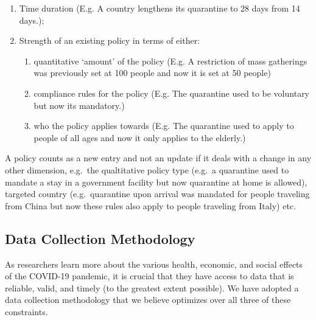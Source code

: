 \documentclass[]{article}
\providecommand{\tightlist}{%
  \setlength{\itemsep}{0pt}\setlength{\parskip}{0pt}}
\begin{document}
\begin{enumerate}
\def\labelenumi{\arabic{enumi}.}
\tightlist
\item
  Time duration (E.g. A country lengthens its quarantine to 28 days from 14 days.);
\item
  Strength of an existing policy in terms of either:

  \begin{enumerate}
  \def\labelenumii{\alph{enumii}.}
  \tightlist
  \item
    quantitative `amount' of the policy (E.g. A restriction of mass gatherings was previously set at 100 people and now it is set at 50 people)
  \item
    compliance rules for the policy (E.g. The quarantine used to be voluntary but now its mandatory.)
  \item
    who the policy applies towards (E.g. The quarantine used to apply to people of all ages and now it only applies to the elderly.)
  \end{enumerate}
\end{enumerate}

A policy counts as a new entry and not an update if it deals with a change in any other dimension, e.g.~the qualtitative policy type (e.g.~a quarantine used to mandate a stay in a government facility but now quarantine at home is allowed), targeted country (e.g.~quarantine upon arrival was mandated for people traveling from China but now these rules also apply to people traveling from Italy) etc.

\hypertarget{data-collection-methodology}{%
\subsection*{Data Collection Methodology}\label{data-collection-methodology}}

As researchers learn more about the various health, economic, and social effects of the COVID-19 pandemic, it is crucial that they have access to data that is reliable, valid, and timely (to the greatest extent possible). We have adopted a data collection methodology that we believe optimizes over all three of these constraints.
\end{document}
